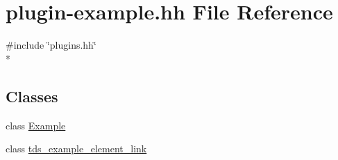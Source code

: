 \hypertarget{plugin-example_8hh}{}\section{plugin-\/example.hh File Reference}
\label{plugin-example_8hh}
{\ttfamily \#include \char`\"{}plugins.\+hh\char`\"{}}\\*
\subsection*{Classes}
\begin{DoxyCompactItemize}
\item 
class \hyperlink{classExample}{Example}
\item 
class \hyperlink{classtds__example__element__link}{tds\+\_\+example\+\_\+element\+\_\+link}
\end{DoxyCompactItemize}
